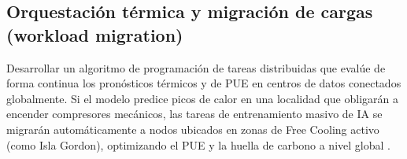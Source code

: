 \subsection{Orquestaci\'on t\'ermica y migraci\'on de cargas (workload migration)}
Desarrollar un algoritmo de programaci\'on de tareas distribuidas que eval\'ue de forma continua los pron\'osticos térmicos y de PUE en centros de datos conectados globalmente. Si el modelo predice picos de calor en una localidad que obligar\'an a encender compresores mec\'anicos, las tareas de entrenamiento masivo de IA se migrar\'an autom\'aticamente a nodos ubicados en zonas de Free Cooling activo (como Isla Gordon), optimizando el PUE y la huella de carbono a nivel global \cite{ghg2015}.
